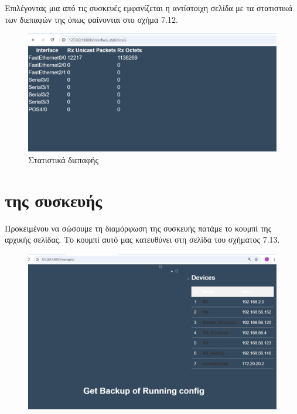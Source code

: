 \FloatBarrier

\noindent Επιλέγοντας μια από τις συσκευές εμφανίζεται η αντίστοιχη σελίδα με τα στατιστικά των διεπαφών της όπως φαίνονται στο σχήμα 7.12.

\FloatBarrier


\begin{figure}[h]
	\centering
	\includegraphics[width=1.0\textwidth]{graphics/interface_statistics.png}
	\caption{Στατιστικά διεπαφής}
\end{figure}


\section{ της συσκευής}

Προκειμένου να σώσουμε τη διαμόρφωση της συσκευής πατάμε το κουμπί
 της αρχικής σελίδας. Το κουμπί αυτό μας κατευθύνει στη σελίδα του σχήματος 7.13.

\FloatBarrier

\begin{figure}[h]
	\centering
	\includegraphics[width=1.0\textwidth]{graphics/backup.png}
	\caption{}
\end{figure}
 
